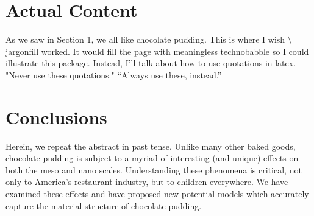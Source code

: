 \documentclass{ccr15}
\begin{document}
\section{Actual Content}
As we saw in Section 1, we all like chocolate pudding. This is where I wish
\textsf{$\setminus$jargonfill} worked. It would fill the page with meaningless technobabble so I could illustrate this
package. Instead, I'll talk about how to use quotations in latex. "Never use these quotations." ``Always use these,
instead.''
\section{Conclusions}
Herein, we repeat the abstract in past tense.
Unlike many other baked goods, chocolate pudding is subject to a myriad of interesting (and unique) effects on both the
meso and nano scales. Understanding these phenomena is critical, not only to America's restaurant industry, but to
children everywhere. We have examined these effects and have proposed new potential models which accurately capture
the material structure of chocolate pudding.

\nocite{ZAB:Mentor05}
\nocite{ZAB:TechHPCG}

%
\end{document}
